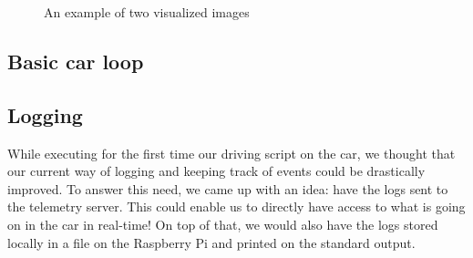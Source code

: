 \documentclass[12pt]{article}
\begin{document}
\begin{figure}[h]
    \centering
    \hfill%
    \caption{An example of two visualized images}
\end{figure}

\subsection{Basic car loop}

\subsection{Logging}
While executing for the first time our driving script on the car, we thought that our current way of logging and keeping track of events could be drastically improved. To answer this need, we came up with an idea: have the logs sent to the telemetry server. This could enable us to directly have access to what is going on in the car in real-time! On top of that, we would also have the logs stored locally in a file on the Raspberry Pi and printed on the standard output. \\  
\end{document}
